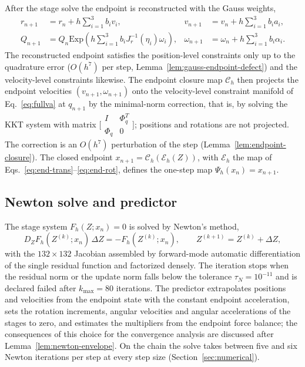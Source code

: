 \documentclass[preprint,12pt]{elsarticle}
\begin{document}
After the stage solve the endpoint is reconstructed with the Gauss weights,
\begin{align}
  r_{n+1} &= r_n+h\sum_{i=1}^3 b_i v_i, &
  v_{n+1} &= v_n+h\sum_{i=1}^3 b_i a_i, \label{eq:end-trans}\\
  Q_{n+1} &= Q_n\mathrm{Exp}\!\left(h\sum_{i=1}^3 b_i J_r^{-1}(\eta_i)\omega_i\right), &
  \omega_{n+1} &= \omega_n+h\sum_{i=1}^3 b_i \alpha_i .
  \label{eq:end-rot}
\end{align}
The reconstructed endpoint satisfies the position-level constraints only up to the quadrature
error ($O(h^7)$ per step, Lemma~\ref{lem:gauss-endpoint-defect}) and the velocity-level constraints
likewise. The endpoint closure map $\mathcal C_h$ then projects the endpoint velocities
$(v_{n+1},\omega_{n+1})$ onto the velocity-level constraint manifold of Eq.~\eqref{eq:fullva} at
$q_{n+1}$ by the minimal-norm correction, that is, by solving the KKT system with matrix
$\bigl[\begin{smallmatrix}I&\Phi_q^T\\ \Phi_q&0\end{smallmatrix}\bigr]$; positions and rotations are
not projected. The correction is an $O(h^7)$ perturbation of the step (Lemma~\ref{lem:endpoint-closure}).
The closed endpoint $x_{n+1}=\mathcal C_h(\mathcal E_h(Z))$, with $\mathcal E_h$ the map of
Eqs.~\eqref{eq:end-trans}--\eqref{eq:end-rot}, defines the one-step map
$\Psi_h(x_n)=x_{n+1}$.

\subsection{Newton solve and predictor}

The stage system $F_h(Z;x_n)=0$ is solved by Newton's method,
\begin{equation}
  D_ZF_h(Z^{(k)};x_n)\,\Delta Z=-F_h(Z^{(k)};x_n),\qquad Z^{(k+1)}=Z^{(k)}+\Delta Z,
  \label{eq:newton}
\end{equation}
with the $132\times132$ Jacobian assembled by forward-mode automatic differentiation of the single
residual function and factorized densely. The iteration stops when the residual norm or the update norm falls below the tolerance
$\tau_N=10^{-11}$ and is declared failed after $k_{\max}=80$ iterations. The predictor
extrapolates positions and velocities from the endpoint state with the constant endpoint
acceleration, sets the rotation increments, angular velocities and angular accelerations of the
stages to zero, and estimates the multipliers from the endpoint force balance; the consequences of
this choice for the convergence analysis are discussed after Lemma~\ref{lem:newton-envelope}. On
the chain the solve takes between five and six Newton iterations per step at every step size
(Section~\ref{sec:numerical}).
\end{document}
